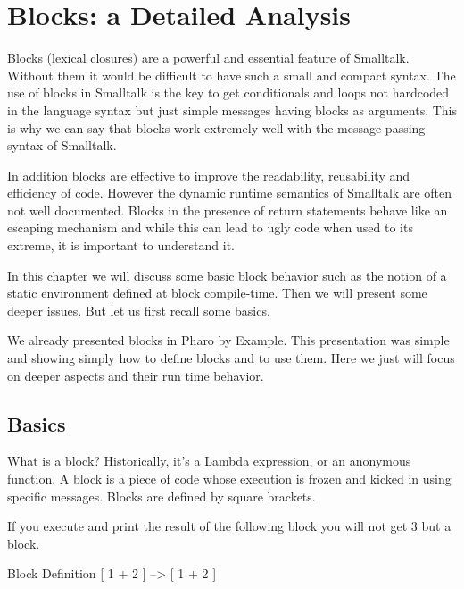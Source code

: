 \documentclass[a4paper,10pt,twoside]{book}
\begin{document}
\fi
\sloppy
\chapter{Blocks: a Detailed Analysis}



Blocks (lexical closures) are a powerful and essential feature of Smalltalk. Without them it
would be difficult to have such a small and compact syntax. The use of blocks in Smalltalk
is the key to get conditionals and loops not hardcoded in the language syntax but just 
simple messages having blocks as arguments. This is why we can say that 
blocks work extremely well with the message passing syntax of Smalltalk.

In addition blocks are  effective to improve the readability, reusability and efficiency of code. 
However the dynamic runtime semantics of Smalltalk are often not well documented. Blocks in the presence of return statements behave like an escaping mechanism and while this can lead to ugly code when used to its extreme, it is important to understand it. 

In this chapter we will discuss some basic block behavior such as the notion of a static environment defined at block compile-time. Then we will present some deeper issues. But let us first recall some basics.

We already presented blocks in Pharo by Example. This presentation was simple and showing simply how to define blocks and to use them. Here we just will focus on deeper aspects and their run time behavior. 

\section{Basics}
What is a block? Historically, it's a Lambda expression, or an anonymous function. A block is a piece of code whose execution is frozen and kicked in using  specific messages.  Blocks are defined by square brackets. 

If you execute and print the result of the following block you will not get 3 but a block. 
\begin{code}{Block Definition}
[ 1 + 2 ]
    --> [ 1 + 2 ]
\end{code}
\end{document}
